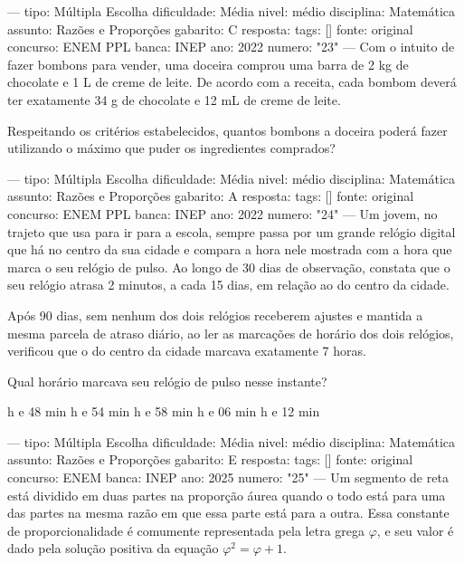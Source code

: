 ---
tipo: Múltipla Escolha
dificuldade: Média
nivel: médio
disciplina: Matemática
assunto: Razões e Proporções
gabarito: C
resposta:
tags: []
fonte: original
concurso: ENEM PPL
banca: INEP
ano: 2022
numero: "23"
---
\question
Com o intuito de fazer bombons para vender, uma doceira comprou uma barra de 2 kg de chocolate e 1 L de creme de leite. De acordo com a receita, cada bombom deverá ter exatamente 34 g de chocolate e 12 mL de creme de leite.

Respeitando os critérios estabelecidos, quantos bombons a doceira poderá fazer utilizando o máximo que puder os ingredientes comprados?
\begin{choices}
\end{choices}

---
tipo: Múltipla Escolha
dificuldade: Média
nivel: médio
disciplina: Matemática
assunto: Razões e Proporções
gabarito: A
resposta:
tags: []
fonte: original
concurso: ENEM PPL
banca: INEP
ano: 2022
numero: "24"
---
\question
Um jovem, no trajeto que usa para ir para a escola, sempre passa por um grande relógio digital que há no centro da sua cidade e compara a hora nele mostrada com a hora que marca o seu relógio de pulso. Ao longo de 30 dias de observação, constata que o seu relógio atrasa 2 minutos, a cada 15 dias, em relação ao do centro da cidade.

Após 90 dias, sem nenhum dos dois relógios receberem ajustes e mantida a mesma parcela de atraso diário, ao ler as marcações de horário dos dois relógios, verificou que o do centro da cidade marcava exatamente 7 horas.

Qual horário marcava seu relógio de pulso nesse instante?
\begin{choices}
 h e 48 min
 h e 54 min
 h e 58 min
 h e 06 min
 h e 12 min
\end{choices}

---
tipo: Múltipla Escolha
dificuldade: Média
nivel: médio
disciplina: Matemática
assunto: Razões e Proporções
gabarito: E
resposta:
tags: []
fonte: original
concurso: ENEM
banca: INEP
ano: 2025
numero: "25"
---
\question
Um segmento de reta está dividido em duas partes na proporção áurea quando o todo está para uma das partes na mesma razão em que essa parte está para a outra. Essa constante de proporcionalidade é comumente representada pela letra grega \(\varphi\), e seu valor é dado pela solução positiva da equação \(\varphi^2=\varphi+1\).

